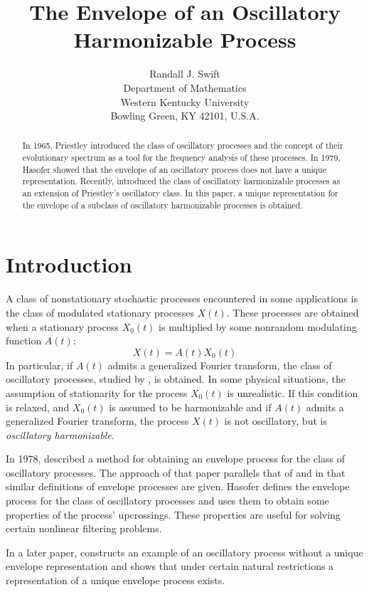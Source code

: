 \documentclass[12pt]{article}
\title{The Envelope of an Oscillatory Harmonizable Process}
\author{Randall J. Swift\\
Department of Mathematics\\
Western Kentucky University\\
Bowling Green, KY 42101, U.S.A.}
\date{}
\begin{document}
\maketitle

\begin{abstract}
In 1965, Priestley introduced the class of oscillatory processes and the concept of their evolutionary spectrum as a tool for the frequency analysis of these processes. In 1979, Hasofer showed that the envelope of an oscillatory process does not have a unique representation. Recently, \cite{Swift1997} introduced the class of oscillatory harmonizable processes as an extension of Priestley's oscillatory class. In this paper, a unique representation for the envelope of a subclass of oscillatory harmonizable processes is obtained.
\end{abstract}

\section{Introduction}

A class of nonstationary stochastic processes encountered in some applications is the class of modulated stationary processes $X(t)$. These processes are obtained when a stationary process $X_0(t)$ is multiplied by some nonrandom modulating function $A(t)$:
\begin{equation}
    X(t) = A(t) X_0(t)
    \label{eq:modulated}
\end{equation}
In particular, if $A(t)$ admits a generalized Fourier transform, the class of oscillatory processes, studied by \cite{Priestley1965}, is obtained. In some physical situations, the assumption of stationarity for the process $X_0(t)$ is unrealistic. If this condition is relaxed, and $X_0(t)$ is assumed to be harmonizable and if $A(t)$ admits a generalized Fourier transform, the process $X(t)$ is not oscillatory, but is \emph{oscillatory harmonizable}.

In 1978, \cite{HasoferPetocz1978} described a method for obtaining an envelope process for the class of oscillatory processes. The approach of that paper parallels that of \cite{Arens1957} and \cite{Yang1972} in that similar definitions of envelope processes are given. Hasofer defines the envelope process for the class of oscillatory processes and uses them to obtain some properties of the process' upcrossings. These properties are useful for solving certain nonlinear filtering problems.

In a later paper, \cite{Hasofer1979} constructs an example of an oscillatory process without a unique envelope representation and shows that under certain natural restrictions a representation of a unique envelope process exists.
\end{document}
